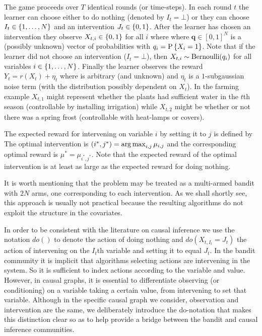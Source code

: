 The game proceeds over $T$ identical rounds (or time-steps).
In each round $t$ the learner can choose either to do nothing (denoted by $I_t = \bot$) or they can choose $I_t \in \set{1,\ldots,N}$ and
an intervention $J_t \in \set{0,1}$. After the learner has chosen an intervention they observe $X_{t,i} \in \set{0,1}$ for all $i$ where
where $\boldsymbol{q} \in [0,1]^N$ is a (possibly unknown) vector of probabilities with $q_i = \P{X_i = 1}$. 
Note that if the learner did not choose an intervention ($I_t =  \bot$), then
$X_{t,i} \sim \bernoulli(q_i)$ for all variables $i \in \set{1,\ldots,N}$.
Finally the learner observes the reward $Y_t = r(X_t) + \eta_t$ where 
is arbitrary (and unknown) 
and $\eta_t$ is a $1$-subgaussian noise
term (with the distribution possibly dependent on $X_t$). 
In the farming example $X_{t,1}$ might represent whether the plants had sufficient water in the $t$th season (controllable by installing irrigation) 
while $X_{t,2}$ might be whether or not there was a spring frost (controllable with heat-lamps or covers).

The expected reward for intervening on variable $i$ by setting it to $j$ is defined by
The optimal intervention is $(i^*,j^*) = \argmax_{i,j} \mu_{i,j}$ and the corresponding optimal reward is $\mu^* = \mu_{i^*,j^*}$. 
Note that the expected reward of the optimal intervention is at least as large as the expected reward for doing nothing.

It is worth mentioning that the problem may be treated as a multi-armed bandit with $2N$ arms, one corresponding to each intervention.
As we shall shortly see, this approach is usually not practical because the resulting algorithms do not exploit the structure in
the covariates.


\begin{remark}
In order to be consistent with the literature on causal inference we use the notation $do()$ to denote the action of doing nothing and $do(X_{t,I_t} = J_t)$
the action of intervening on the $I_t$th variable and setting it to equal $J_t$. 
In the bandit community it is implicit that 
algorithms selecting actions are intervening in the system. So it is sufficient to index actions according to the variable and value. 
However, in causal graphs, it is essential to differentiate observing (or conditioning) on a variable taking a certain value, from 
intervening to set that variable. Although in the specific causal graph we consider, observation and intervention are the same, we 
deliberately introduce the do-notation \cite{Pearl2000} that makes this distinction clear so as to help provide a bridge between the 
bandit and causal inference communities.
\end{remark}


